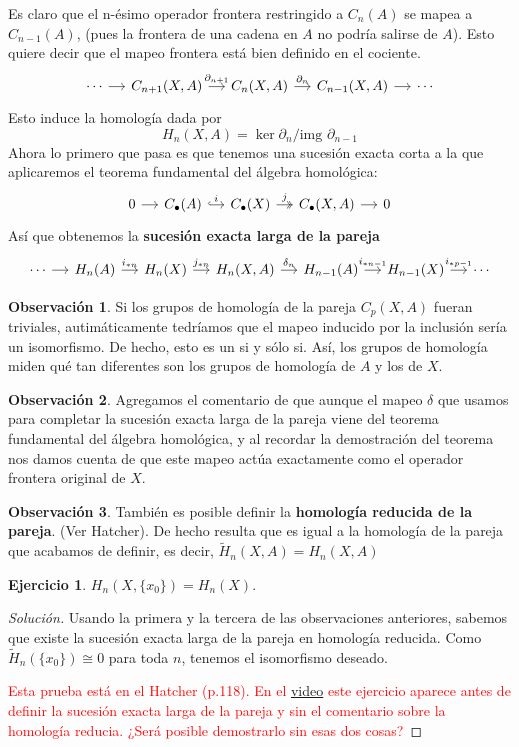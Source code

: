 \documentclass[spanish]{book}
\theoremstyle{definition}
\newtheorem*{obs}{Observación}
\newtheorem*{ejer}{Ejercicio}
\begin{document}
	Es claro que el n-ésimo operador frontera restringido a $C_n(A)$ se mapea a $C_{n-1}(A)$, (pues la frontera de una cadena en $A$ no podría salirse de $A$). Esto quiere decir que el mapeo frontera está bien definido en el cociente. 
	\[\begin{tikzcd}[column sep=small]
		\cdots \arrow[r] & C_{n+1}(X,A) \arrow[r, "\partial_{n+1}"] & C_n(X,A) \arrow[r, "\partial_n"] & C_{n-1}(X,A) \arrow[r] & \cdots
	\end{tikzcd}\]
	Esto induce la homología dada por
	\[H_n(X,A)=\ker\partial_n/\text{img }\partial_{n-1}\]
		Ahora lo primero que pasa es que tenemos una sucesión exacta corta a la que aplicaremos el teorema fundamental del álgebra homológica:
		\[
		\begin{tikzcd}[column sep=small]
			0 \arrow[r] & C_\bullet(A) \arrow[r, hook, "i"] & C_\bullet(X) \arrow[r, two heads, "j"] & C_\bullet(X,A) \arrow[r] & 0
		\end{tikzcd}
		\]
		Así que obtenemos la \textbf{sucesión exacta larga de la pareja}
		\[\begin{tikzcd}[column sep=small]
			\cdots \arrow[r] & H_n(A) \arrow[r, "i_{*n}"] & H_n(X) \arrow[r, "j_{*n}"] & H_n(X,A) \arrow[r, "\delta_n"] & H_{n-1}(A) \arrow[r, "i_{*n-1}"] & H_{n-1}(X) \arrow[r, "i_{*p-1}"] & \cdots
		\end{tikzcd}\]
		\begin{obs}
			Si los grupos de homología de la pareja $C_p(X,A)$ fueran triviales, autimáticamente tedríamos que el mapeo inducido por la inclusión sería un isomorfismo. De hecho, esto es un si y sólo si. Así, los grupos de homología miden qué tan diferentes son los grupos de homología de $A$ y los de $X$.
		\end{obs}
		\begin{obs}
		Agregamos el comentario de que aunque el mapeo $\delta$ que usamos para completar la sucesión exacta larga de la pareja viene del teorema fundamental del álgebra homológica, y al recordar la demostración del teorema nos damos cuenta de que este mapeo actúa exactamente como el operador frontera original de $X$.
		\end{obs}
		\begin{obs}
			También es posible definir la \textbf{homología reducida de la pareja}. (Ver Hatcher). De hecho resulta que es igual a la homología de la pareja que acabamos de definir, es decir, $\tilde{H}_n(X,A)=H_n(X,A)$
		\end{obs}
		\begin{ejer}
			$H_n(X,\{x_0\})=H_n(X)$. 
		\begin{proof}[Solución]
			Usando la primera y la tercera de las observaciones anteriores, sabemos que existe la sucesión exacta larga de la pareja en homología reducida. Como $\tilde{H}_n(\{x_0\})\cong0$ para toda $n$, tenemos el isomorfismo deseado.
			
			\textcolor{red}{Esta prueba está en el Hatcher (p.118). En el \href{https://www.youtube.com/watch?v=CwVxrSoU_ZU}{video} este ejercicio aparece antes de definir la sucesión exacta larga de la pareja y sin el comentario sobre la homología reducia. ¿Será posible demostrarlo sin esas dos cosas?}
		\end{proof}
		\end{ejer}
\end{document}
